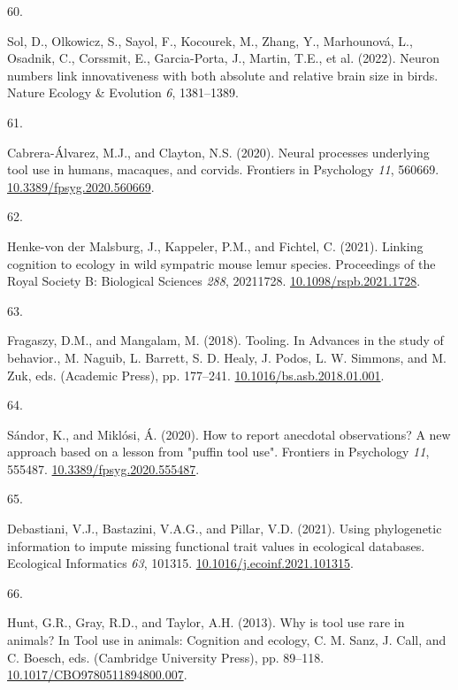 \documentclass[
  man, donotrepeattitle,floatsintext]{apa6}
\newlength{\cslhangindent}
\newlength{\csllabelwidth}
\newlength{\cslentryspacingunit} %
\newenvironment{CSLReferences}[2] %
 {%
  \setlength{\parindent}{0pt}
  \ifodd #1
  \let\oldpar\par
  \def\par{\hangindent=\cslhangindent\oldpar}
  \fi
  \setlength{\parskip}{#2\cslentryspacingunit}
 }%
 {}
\newcommand{\CSLLeftMargin}[1]{\parbox[t]{\csllabelwidth}{#1}}
\newcommand{\CSLRightInline}[1]{\parbox[t]{\linewidth - \csllabelwidth}{#1}\break}
\begin{document}
\begin{CSLReferences}{0}{0}
\leavevmode{}%
\CSLLeftMargin{60. }%
\CSLRightInline{Sol, D., Olkowicz, S., Sayol, F., Kocourek, M., Zhang, Y., Marhounová, L., Osadnik, C., Corssmit, E., Garcia-Porta, J., Martin, T.E., et al. (2022). Neuron numbers link innovativeness with both absolute and relative brain size in birds. Nature Ecology \& Evolution \emph{6}, 1381--1389.}

\leavevmode{}%
\CSLLeftMargin{61. }%
\CSLRightInline{Cabrera-Álvarez, M.J., and Clayton, N.S. (2020). Neural processes underlying tool use in humans, macaques, and corvids. Frontiers in Psychology \emph{11}, 560669. \href{https://doi.org/10.3389/fpsyg.2020.560669}{10.3389/fpsyg.2020.560669}.}

\leavevmode{}%
\CSLLeftMargin{62. }%
\CSLRightInline{Henke-von der Malsburg, J., Kappeler, P.M., and Fichtel, C. (2021). Linking cognition to ecology in wild sympatric mouse lemur species. Proceedings of the Royal Society B: Biological Sciences \emph{288}, 20211728. \href{https://doi.org/10.1098/rspb.2021.1728}{10.1098/rspb.2021.1728}.}

\leavevmode{}%
\CSLLeftMargin{63. }%
\CSLRightInline{Fragaszy, D.M., and Mangalam, M. (2018). Tooling. In Advances in the study of behavior., M. Naguib, L. Barrett, S. D. Healy, J. Podos, L. W. Simmons, and M. Zuk, eds. (Academic Press), pp. 177--241. \href{https://doi.org/10.1016/bs.asb.2018.01.001}{10.1016/bs.asb.2018.01.001}.}

\leavevmode{}%
\CSLLeftMargin{64. }%
\CSLRightInline{Sándor, K., and Miklósi, Á. (2020). How to report anecdotal observations? A new approach based on a lesson from "puffin tool use". Frontiers in Psychology \emph{11}, 555487. \href{https://doi.org/10.3389/fpsyg.2020.555487}{10.3389/fpsyg.2020.555487}.}

\leavevmode{}%
\CSLLeftMargin{65. }%
\CSLRightInline{Debastiani, V.J., Bastazini, V.A.G., and Pillar, V.D. (2021). Using phylogenetic information to impute missing functional trait values in ecological databases. Ecological Informatics \emph{63}, 101315. \href{https://doi.org/10.1016/j.ecoinf.2021.101315}{10.1016/j.ecoinf.2021.101315}.}

\leavevmode{}%
\CSLLeftMargin{66. }%
\CSLRightInline{Hunt, G.R., Gray, R.D., and Taylor, A.H. (2013). Why is tool use rare in animals? In Tool use in animals: Cognition and ecology, C. M. Sanz, J. Call, and C. Boesch, eds. (Cambridge University Press), pp. 89--118. \href{https://doi.org/10.1017/CBO9780511894800.007}{10.1017/CBO9780511894800.007}.}


\end{CSLReferences}
\end{document}
